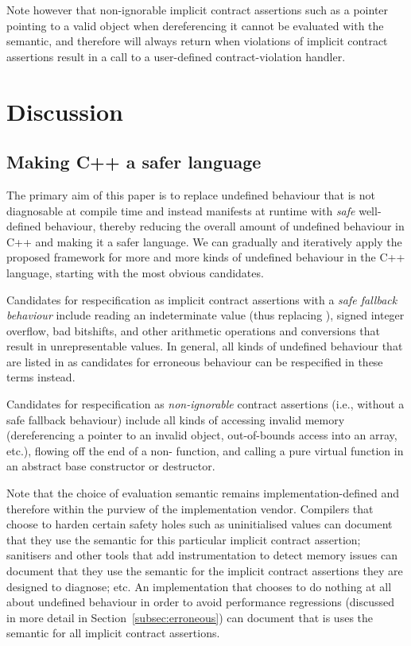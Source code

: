 Note however that non-ignorable implicit contract assertions such as a pointer pointing to a valid object when dereferencing it cannot be evaluated with the  semantic, and therefore  will always return  when violations of implicit contract assertions result in a call to a user-defined contract-violation handler.

\section{Discussion}

\subsection{Making C++ a safer language}
\label{subsec:makingsafe}

The primary aim of this paper is to replace undefined behaviour that is not diagnosable at compile time and instead manifests at runtime with \emph{safe} well-defined behaviour, thereby reducing the overall amount of undefined behaviour in C++ and making it a safer language. We can gradually and iteratively apply the proposed framework for more and more kinds of undefined behaviour in the C++ language, starting with the most obvious candidates.

Candidates for respecification as implicit contract assertions with a \emph{safe fallback behaviour} include reading an indeterminate value (thus replacing \cite{P2795R5}), signed integer overflow, bad bitshifts, and other arithmetic operations and conversions that result in unrepresentable values. In general, all kinds of undefined behaviour that are listed in \cite{P2795R5} as candidates for erroneous behaviour can be respecified in these terms instead.

Candidates for respecification as \emph{non-ignorable} contract assertions (i.e., without a safe fallback behaviour) include all kinds of accessing invalid memory (dereferencing a pointer to an invalid object, out-of-bounds access into an array, etc.), flowing off the end of a non- function, and calling a pure virtual function in an abstract base constructor or destructor.

Note that the choice of evaluation semantic remains implementation-defined and therefore within the purview of the implementation vendor. Compilers that choose to harden certain safety holes such as uninitialised values can document that they use the  semantic for this particular implicit contract assertion; sanitisers and other tools that add instrumentation to detect memory issues can document that they use the  semantic for the implicit contract assertions they are designed to diagnose; etc. An implementation that chooses to do nothing at all about undefined behaviour in order to avoid performance regressions (discussed in more detail in Section~\ref{subsec:erroneous}) can document that is uses the  semantic for all implicit contract assertions.

